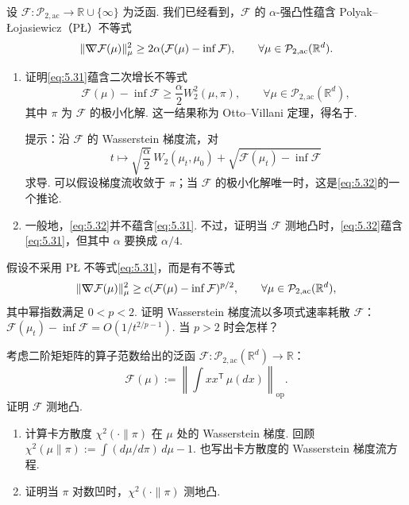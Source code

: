 \begin{exercise}\label{exer:5.5}
设 $\mathcal F:\mathcal P_{2,\mathrm{ac}}\to\mathbb R\cup\{\infty\}$ 为泛函. 我们已经看到，$\mathcal F$ 的 $\alpha$-强凸性蕴含 Polyak--Łojasiewicz（PŁ）不等式
\begin{equation}\label{eq:5.31}
\|\nabla\mkern-10mu\nabla\mathcal F(\mu)\|_\mu^2
\geq2\alpha(\mathcal F(\mu)-\inf\mathcal F),
\qquad\forall\mu\in\mathcal P_{2,\mathrm{ac}}(\mathbb R^d).
\end{equation}
\begin{enumerate}
\renewcommand{\labelenumi}{(\alph{enumi})}
\item 证明\eqref{eq:5.31}蕴含二次增长不等式
\begin{equation}\label{eq:5.32}
\mathcal F(\mu)-\inf\mathcal F\geq\frac\alpha2W_2^2(\mu,\pi),
\qquad\forall\mu\in\mathcal P_{2,\mathrm{ac}}(\mathbb R^d),
\end{equation}
其中 $\pi$ 为 $\mathcal F$ 的极小化解. 这一结果称为 Otto--Villani 定理，得名于\cite{ref250}.

提示：沿 $\mathcal F$ 的 Wasserstein 梯度流，对
$$
t\mapsto\sqrt{\frac\alpha2}\,W_2(\mu_t,\mu_0)
+\sqrt{\mathcal F(\mu_t)-\inf\mathcal F}
$$
求导. 可以假设梯度流收敛于 $\pi$；当 $\mathcal F$ 的极小化解唯一时，这是\eqref{eq:5.32}的一个推论.
\item 一般地，\eqref{eq:5.32}并不蕴含\eqref{eq:5.31}. 不过，证明当 $\mathcal F$ 测地凸时，\eqref{eq:5.32}蕴含\eqref{eq:5.31}，但其中 $\alpha$ 要换成 $\alpha/4$.
\end{enumerate}
\end{exercise}

\begin{exercise}\label{exer:5.6}
假设不采用 PŁ 不等式\eqref{eq:5.31}，而是有不等式
$$
\|\nabla\mkern-10mu\nabla\mathcal F(\mu)\|_\mu^2
\geq c(\mathcal F(\mu)-\inf\mathcal F)^{p/2},
\qquad\forall\mu\in\mathcal P_{2,\mathrm{ac}}(\mathbb R^d),
$$
其中幂指数满足 $0<p<2$. 证明 Wasserstein 梯度流以多项式速率耗散 $\mathcal F$：$\mathcal F(\mu_t)-\inf\mathcal F=O(1/t^{2/p-1})$. 当 $p>2$ 时会怎样？
\end{exercise}

\begin{exercise}\label{exer:5.7}
考虑二阶矩矩阵的算子范数给出的泛函 $\mathcal F:\mathcal P_{2,\mathrm{ac}}(\mathbb R^d)\to\mathbb R$：
$$
\mathcal F(\mu):=\left\|\int xx^{\mathsf T}\,\mu(dx)\right\|_{\mathrm{op}}.
$$
证明 $\mathcal F$ 测地凸.
\end{exercise}

\begin{exercise}\label{exer:5.8}\leavevmode
\begin{enumerate}
\renewcommand{\labelenumi}{(\alph{enumi})}
\item 计算卡方散度 $\chi^2(\cdot\|\pi)$ 在 $\mu$ 处的 Wasserstein 梯度. 回顾 $\chi^2(\mu\|\pi):=\int(d\mu/d\pi)\,d\mu-1$. 也写出卡方散度的 Wasserstein 梯度流方程.
\item 证明当 $\pi$ 对数凹时，$\chi^2(\cdot\|\pi)$ 测地凸.
\end{enumerate}
\end{exercise}

